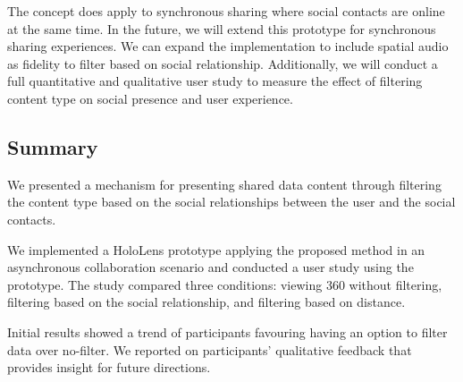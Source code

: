 The concept does apply to synchronous sharing where social contacts are online at the same time. In the future, we will extend this prototype for synchronous sharing experiences. We can expand the implementation to include spatial audio as fidelity to filter based on social relationship. 
Additionally, we will conduct a full quantitative and qualitative user study to measure the effect of filtering content type on social presence and user experience. 

\subsection{Summary}

We presented a mechanism for presenting shared data content through filtering the content type based on the social relationships between the user and the social contacts. 

We implemented a HoloLens prototype applying the proposed method in an asynchronous collaboration scenario and conducted a user study using the prototype. The study compared three conditions: viewing 360 without filtering, filtering based on the social relationship, and filtering based on distance. 

Initial results showed a trend of participants favouring having an option to filter data over no-filter. We reported on participants' qualitative feedback that provides insight for future directions. 
